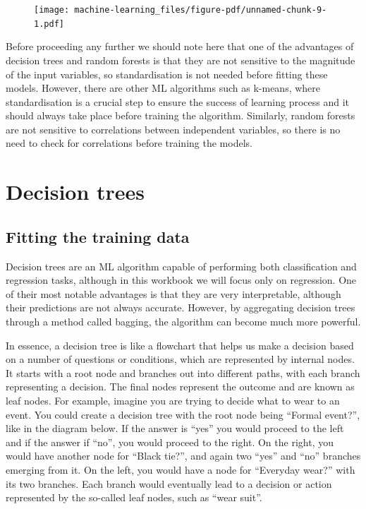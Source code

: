\documentclass[
  letterpaper,
  DIV=11,
  numbers=noendperiod]{scrreprt}
\begin{document}
\begin{figure}[H]

{\centering \texttt{[image: machine-learning\_files/figure-pdf/unnamed-chunk-9-1.pdf]}

}

\end{figure}

Before proceeding any further we should note here that one of the
advantages of decision trees and random forests is that they are not
sensitive to the magnitude of the input variables, so standardisation is
not needed before fitting these models. However, there are other ML
algorithms such as k-means, where standardisation is a crucial step to
ensure the success of learning process and it should always take place
before training the algorithm. Similarly, random forests are not
sensitive to correlations between independent variables, so there is no
need to check for correlations before training the models.

\hypertarget{decision-trees}{%
\section{Decision trees}\label{decision-trees}}

\hypertarget{fitting-the-training-data}{%
\subsection{Fitting the training data}\label{fitting-the-training-data}}

Decision trees are an ML algorithm capable of performing both
classification and regression tasks, although in this workbook we will
focus only on regression. One of their most notable advantages is that
they are very interpretable, although their predictions are not always
accurate. However, by aggregating decision trees through a method called
bagging, the algorithm can become much more powerful.

In essence, a decision tree is like a flowchart that helps us make a
decision based on a number of questions or conditions, which are
represented by internal nodes. It starts with a root node and branches
out into different paths, with each branch representing a decision. The
final nodes represent the outcome and are known as leaf nodes. For
example, imagine you are trying to decide what to wear to an event. You
could create a decision tree with the root node being ``Formal event?'',
like in the diagram below. If the answer is ``yes'' you would proceed to
the left and if the answer if ``no'', you would proceed to the right. On
the right, you would have another node for ``Black tie?'', and again two
``yes'' and ``no'' branches emerging from it. On the left, you would
have a node for ``Everyday wear?'' with its two branches. Each branch
would eventually lead to a decision or action represented by the
so-called leaf nodes, such as ``wear suit''.
\end{document}
